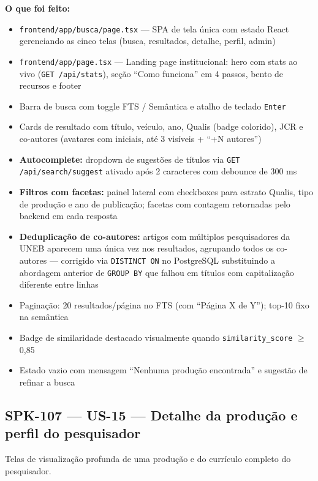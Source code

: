\documentclass[12pt,a4paper]{article}
\begin{document}
\textbf{O que foi feito:}
\begin{itemize}[noitemsep]
  \item \texttt{frontend/app/busca/page.tsx} — SPA de tela única com estado React gerenciando as cinco
        telas (busca, resultados, detalhe, perfil, admin)
  \item \texttt{frontend/app/page.tsx} — Landing page institucional: hero com stats ao vivo
        (\texttt{GET /api/stats}), seção ``Como funciona'' em 4 passos, bento de recursos e footer
  \item Barra de busca com toggle FTS / Semântica e atalho de teclado \texttt{Enter}
  \item Cards de resultado com título, veículo, ano, Qualis (badge colorido), JCR e co-autores
        (avatares com iniciais, até 3 visíveis + ``+N autores'')
  \item \textbf{Autocomplete:} dropdown de sugestões de títulos via \texttt{GET /api/search/suggest}
        ativado após 2 caracteres com debounce de 300 ms
  \item \textbf{Filtros com facetas:} painel lateral com checkboxes para estrato Qualis, tipo de
        produção e ano de publicação; facetas com contagem retornadas pelo backend em cada resposta
  \item \textbf{Deduplicação de co-autores:} artigos com múltiplos pesquisadores da UNEB aparecem
        uma única vez nos resultados, agrupando todos os co-autores — corrigido via \texttt{DISTINCT ON}
        no PostgreSQL substituindo a abordagem anterior de \texttt{GROUP BY} que falhou em títulos com
        capitalização diferente entre linhas
  \item Paginação: 20 resultados/página no FTS (com ``Página X de Y''); top-10 fixo na semântica
  \item Badge de similaridade destacado visualmente quando \texttt{similarity\_score} $\geq$ 0,85
  \item Estado vazio com mensagem ``Nenhuma produção encontrada'' e sugestão de refinar a busca
\end{itemize}

\subsection{SPK-107 — US-15 — Detalhe da produção e perfil do pesquisador}

Telas de visualização profunda de uma produção e do currículo completo do pesquisador.
\end{document}
